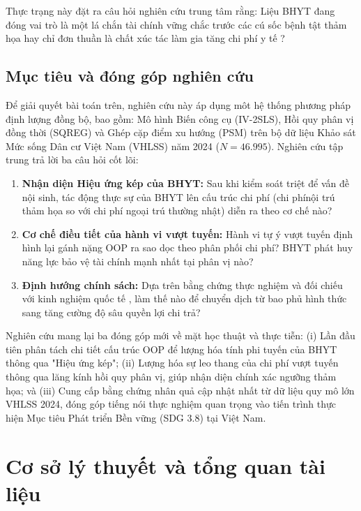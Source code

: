 \documentclass[12pt,a4paper]{article}
\begin{document}
Thực trạng này đặt ra câu hỏi nghiên cứu trung tâm rằng: Liệu BHYT đang đóng vai trò là một lá chắn tài chính vững chắc trước các cú sốc bệnh tật thảm họa hay chỉ đơn thuần là chất xúc tác làm gia tăng chi phí y tế ?

\subsection{Mục tiêu và đóng góp nghiên cứu}

Để giải quyết bài toán trên, nghiên cứu này áp dụng môt hệ thống phương pháp định lượng đồng bộ, bao gồm: Mô hình Biến công cụ (IV-2SLS), Hồi quy phân vị đồng thời (SQREG) và Ghép cặp điểm xu hướng (PSM) trên bộ dữ liệu Khảo sát Mức sống Dân cư Việt Nam (VHLSS) năm 2024 ($N = 46.995$). Nghiên cứu tập trung trả lời ba câu hỏi cốt lõi:

\begin{enumerate}
	\item \textbf{Nhận diện Hiệu ứng kép của BHYT:} Sau khi kiểm soát triệt để vấn đề nội sinh, tác động thực sự của BHYT lên cấu trúc chi phí (chi phínội trú thảm họa so với chi phí ngoại trú thường nhật) diễn ra theo cơ chế nào?
	
	\item \textbf{Cơ chế điều tiết của hành vi vượt tuyến:} Hành vi tự ý vượt tuyến định hình lại gánh nặng OOP ra sao dọc theo phân phối chi phí? BHYT phát huy năng lực bảo vệ tài chính mạnh nhất tại phân vị nào?
	
	\item \textbf{Định hướng chính sách:} Dựa trên bằng chứng thực nghiệm và đối chiếu với kinh nghiệm quốc tế \parencite{feldstein2011}, làm thế nào để chuyển dịch từ bao phủ hình thức sang tăng cường độ sâu quyền lợi chi trả?
\end{enumerate}

Nghiên cứu mang lại ba đóng góp mới về mặt học thuật và thực tiễn: (i) Lần đầu tiên phân tách chi tiết cấu trúc OOP để lượng hóa tính phi tuyến của BHYT thông qua "Hiệu ứng kép"; (ii) Lượng hóa sự leo thang của chi phí vượt tuyến thông qua lăng kính hồi quy phân vị, giúp nhận diện chính xác ngưỡng thảm họa; và (iii) Cung cấp bằng chứng nhân quả cập nhật nhất từ dữ liệu quy mô lớn VHLSS 2024, đóng góp tiếng nói thực nghiệm quan trọng vào tiến trình thực hiện Mục tiêu Phát triển Bền vững (SDG 3.8) tại Việt Nam.

\section{Cơ sở lý thuyết và tổng quan tài liệu}
\end{document}
